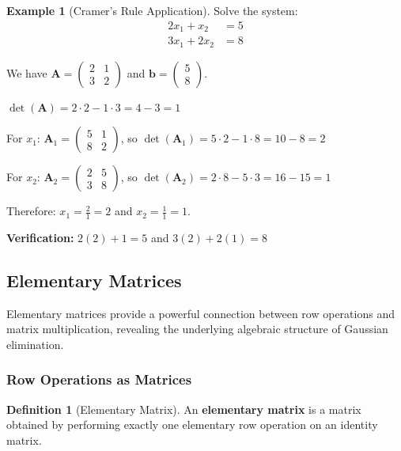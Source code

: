 \documentclass[12pt]{article}
\numberwithin{equation}{section}
\newcommand{\vect}[1]{\boldsymbol{#1}}   %
\newcommand{\mat}[1]{\mathbf{#1}}        %
\theoremstyle{plain}
\theoremstyle{definition}
\newtheorem{definition}[theorem]{Definition}
\newtheorem{example}[theorem]{Example}
\theoremstyle{remark}
\begin{document}
\begin{example}[Cramer's Rule Application]
Solve the system:
\begin{align}
2x_1 + x_2 &= 5\\
3x_1 + 2x_2 &= 8
\end{align}

We have $\mat{A} = \begin{pmatrix} 2 & 1 \\ 3 & 2 \end{pmatrix}$ and $\vect{b} = \begin{pmatrix} 5 \\ 8 \end{pmatrix}$.

$\det(\mat{A}) = 2 \cdot 2 - 1 \cdot 3 = 4 - 3 = 1$

For $x_1$: $\mat{A}_1 = \begin{pmatrix} 5 & 1 \\ 8 & 2 \end{pmatrix}$, so $\det(\mat{A}_1) = 5 \cdot 2 - 1 \cdot 8 = 10 - 8 = 2$

For $x_2$: $\mat{A}_2 = \begin{pmatrix} 2 & 5 \\ 3 & 8 \end{pmatrix}$, so $\det(\mat{A}_2) = 2 \cdot 8 - 5 \cdot 3 = 16 - 15 = 1$

Therefore: $x_1 = \frac{2}{1} = 2$ and $x_2 = \frac{1}{1} = 1$.

\textbf{Verification:} $2(2) + 1 = 5$ \checkmark and $3(2) + 2(1) = 8$ \checkmark
\end{example}

\subsection{Elementary Matrices}

Elementary matrices provide a powerful connection between row operations and matrix multiplication, revealing the underlying algebraic structure of Gaussian elimination.

\subsubsection{Row Operations as Matrices}

\begin{definition}[Elementary Matrix]
An \textbf{elementary matrix} is a matrix obtained by performing exactly one elementary row operation on an identity matrix.
\end{definition}
\end{document}
